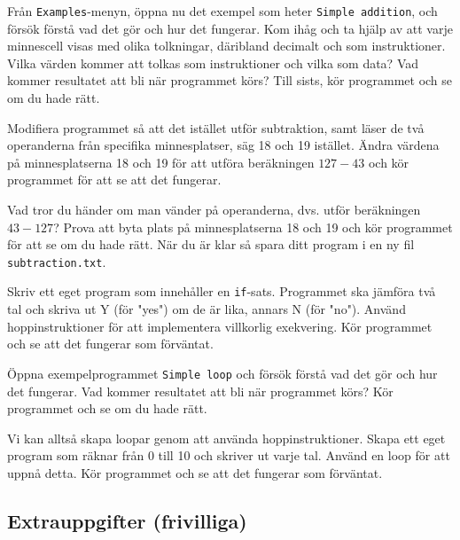 \begin{Datorarbete}
    \item Från \texttt{Examples}-menyn, öppna nu det exempel som heter \texttt{Simple addition}, och försök förstå vad det gör och hur det fungerar. Kom ihåg och ta hjälp av att varje minnescell visas med olika tolkningar, däribland decimalt och som instruktioner. Vilka värden kommer att tolkas som instruktioner och vilka som data? Vad kommer resultatet att bli när programmet körs? Till sists, kör programmet och se om du hade rätt.

    \item Modifiera programmet så att det istället utför subtraktion, samt läser de två operanderna från specifika minnesplatser, säg 18 och 19 istället. Ändra värdena på minnesplatserna 18 och 19 för att utföra beräkningen \(127-43\) och kör programmet för att se att det fungerar.

    Vad tror du händer om man vänder på operanderna, dvs. utför beräkningen \(43-127\)? Prova att byta plats på minnesplatserna 18 och 19 och kör programmet för att se om du hade rätt. När du är klar så spara ditt program i en ny fil \texttt{subtraction.txt}.

    \item Skriv ett eget program som innehåller en \texttt{if}-sats. Programmet ska jämföra två tal och skriva ut Y (för "yes") om de är lika, annars N (för "no"). Använd hoppinstruktioner för att implementera villkorlig exekvering. Kör programmet och se att det fungerar som förväntat.

    \item Öppna exempelprogrammet \texttt{Simple loop} och försök förstå vad det gör och hur det fungerar. Vad kommer resultatet att bli när programmet körs? Kör programmet och se om du hade rätt.

    \item Vi kan alltså skapa loopar genom att använda hoppinstruktioner. Skapa ett eget program som räknar från 0 till 10 och skriver ut varje tal. Använd en loop för att uppnå detta. Kör programmet och se att det fungerar som förväntat.
\end{Datorarbete}


\subsection{Extrauppgifter (frivilliga)}

